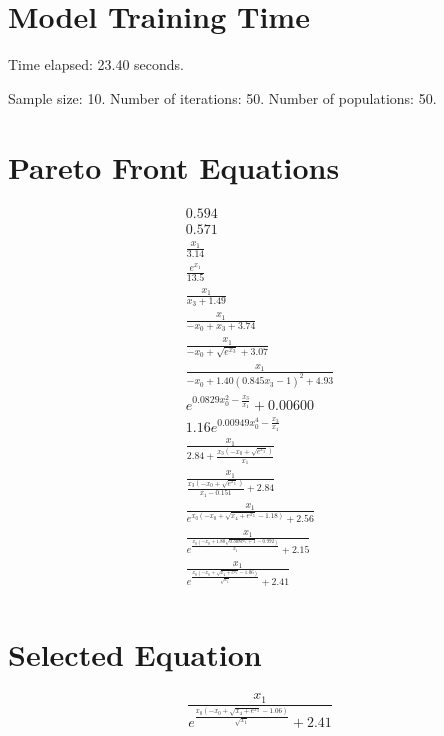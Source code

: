 \documentclass{article}
\begin{document}
\section*{Model Training Time}
Time elapsed: 23.40 seconds.

Sample size: 10.
Number of iterations: 50.
Number of populations: 50.

\section*{Pareto Front Equations}
\begin{align*}
0.594 \\
0.571 \\
\frac{x_{1}}{3.14} \\
\frac{e^{x_{1}}}{13.5} \\
\frac{x_{1}}{x_{3} + 1.49} \\
\frac{x_{1}}{- x_{0} + x_{3} + 3.74} \\
\frac{x_{1}}{- x_{0} + \sqrt{e^{x_{3}}} + 3.07} \\
\frac{x_{1}}{- x_{0} + 1.40 \left(0.845 x_{3} - 1\right)^{2} + 4.93} \\
e^{0.0829 x_{0}^{2} - \frac{x_{3}}{x_{1}}} + 0.00600 \\
1.16 e^{0.00949 x_{0}^{4} - \frac{x_{3}}{x_{1}}} \\
\frac{x_{1}}{2.84 + \frac{x_{3} \left(- x_{0} + \sqrt{e^{x_{3}}}\right)}{x_{1}}} \\
\frac{x_{1}}{\frac{x_{3} \left(- x_{0} + \sqrt{e^{x_{3}}}\right)}{x_{1} - 0.151} + 2.84} \\
\frac{x_{1}}{e^{x_{0} \left(- x_{0} + \sqrt{x_{4} + e^{x_{3}}} - 1.18\right)} + 2.56} \\
\frac{x_{1}}{e^{\frac{x_{0} \left(- x_{0} + 1.80 \sqrt{0.308 e^{x_{3}} + 1} - 0.992\right)}{x_{1}}} + 2.15} \\
\frac{x_{1}}{e^{\frac{x_{0} \left(- x_{0} + \sqrt{x_{4} + e^{x_{3}}} - 1.06\right)}{\sqrt{x_{1}}}} + 2.41} \\
\end{align*}

\section*{Selected Equation}
\[ \frac{x_{1}}{e^{\frac{x_{0} \left(- x_{0} + \sqrt{x_{4} + e^{x_{3}}} - 1.06\right)}{\sqrt{x_{1}}}} + 2.41} \]
\end{document}
